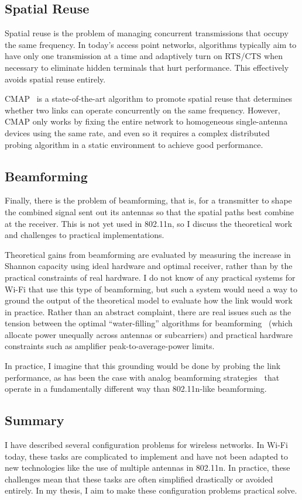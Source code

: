 \subsection{Spatial Reuse}
Spatial reuse is the problem of managing concurrent transmissions that occupy the same frequency. In today's access point networks, algorithms typically aim to have only one transmission at a time and adaptively turn on RTS/CTS when necessary to eliminate hidden terminals that hurt performance. This effectively avoids spatial reuse entirely.

CMAP~\cite{Vutukuru_CMAP} is a state-of-the-art algorithm to promote spatial reuse that determines whether two links can operate concurrently on the same frequency. However, CMAP only works by fixing the entire network to homogeneous single-antenna devices using the same rate, and even so it requires a complex distributed probing algorithm in a static environment to achieve good performance.

\subsection{Beamforming}
Finally, there is the problem of beamforming, that is, for a transmitter to shape the combined signal sent out its antennas so that the spatial paths best combine at the receiver. This is not yet used in 802.11n, so I discuss the theoretical work and challenges to practical implementations.

Theoretical gains from beamforming are evaluated by measuring the increase in Shannon capacity using ideal hardware and optimal receiver, rather than by the practical constraints of real hardware. I do not know of any practical systems for Wi-Fi that use this type of beamforming, but such a system would need a way to ground the output of the theoretical model to evaluate how the link would work in practice. Rather than an abstract complaint, there are real issues such as the tension between the optimal ``water-filling'' algorithms for beamforming~\cite{Tse} (which allocate power unequally across antennas or subcarriers) and practical hardware constraints such as amplifier peak-to-average-power limits.

In practice, I imagine that this grounding would be done by probing the link performance, as has been the case with analog beamforming strategies~\cite{Liu_DIRC} that operate in a fundamentally different way than 802.11n-like beamforming.

\subsection{Summary}
I have described several configuration problems for wireless networks. In Wi-Fi today, these tasks are complicated to implement and have not been adapted to new technologies like the use of multiple antennas in 802.11n. In practice, these challenges mean that these tasks are often simplified drastically or avoided entirely. In my thesis, I aim to make these configuration problems practical solve.

